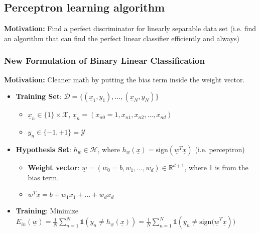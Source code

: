 \subsection{Perceptron learning algorithm}
    \textbf{Motivation:} Find a perfect discriminator for linearly separable data set (i.e. find an algorithm that can find the perfect linear classifier efficiently and always)
    \subsubsection{New Formulation of Binary Linear Classification}
    \textbf{Motivation:} Cleaner math by putting the bias term inside the weight vector.
    \begin{definition}
        \begin{itemize}
            \item \textbf{Training Set}: $\mathcal{D} = \{(\underline{x}_1, y_1), \dots, (\underline{x}_N, y_N)\}$
            \begin{itemize}
                \item $\underline{x}_n \in \{1\} \times \mathcal{X}$, $\underline{x}_n = (x_{n0} = 1, x_{n1}, x_{n2}, \dots, x_{nd})$
                \item $y_n \in \{-1, +1\} = \mathcal{Y}$
            \end{itemize}
            \item \textbf{Hypothesis Set}: $h_{\underline{w}} \in \mathcal{H}$, where $h_{\underline{w}}(\underline{x}) = \text{sign}(\underline{w}^T \underline{x})$ (i.e. perceptron) 
            \begin{itemize}
                \item \textbf{Weight vector}: $\underline{w} = (w_0=b, w_1, \dots, w_d) \in \mathbb{R}^{d+1}$, where 1 is from the bias term.
                \item $\underline{w}^T \underline{x} = b + w_1 x_1 + \ldots + w_d x_d$
            \end{itemize}
            \item \textbf{Training}: Minimize $E_{in}(\underline{w}) = \frac{1}{N} \sum_{n=1}^N \mathbb{1}(y_n \neq h_{\underline{w}}(\underline{x})) = \frac{1}{N} \sum_{n=1}^N \mathbb{1}(y_n \neq \text{sign}{(\underline{w}}^T \underline{x}))$
        \end{itemize}
    \end{definition}
    
